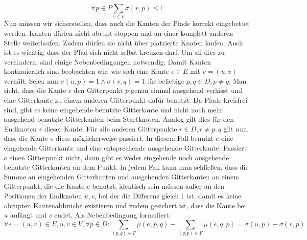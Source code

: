 \documentclass[bachelor, german]{algothesis}
\begin{document}
\begin{equation}
    \forall p \in P \sum_{v \in V} \sigma(v,p) \leq 1
    \tag{2}
\end{equation}
Nun müssen wir sicherstellen, dass auch die Kanten der Pfade korrekt eingebettet werden. Kanten dürfen nicht abrupt stoppen und an einer komplett anderen Stelle weiterlaufen. Zudem dürfen sie nicht über platzierte Knoten laufen. Auch ist es wichtig, dass der Pfad sich nicht selbst kreuzen darf. Um all dies zu verhindern, sind einige Nebenbedingungen notwendig. \newline
Damit Kanten kontinuierlich sind beobachten wir, wie sich eine Kante $e \in E$ mit $e = (u,v)$ verhält. Seien nun $\sigma(u,p) = 1 \land \sigma(v,q) = 1$ für beliebige $p,q \in D, p \neq q$. Man sieht, dass die Kante $e$ den Gitterpunkt $p$ genau einmal ausgehend verlässt und eine Gitterkante zu einem anderen Gitterpunkt dafür benutzt.  Da Pfade kreisfrei sind, gibt es keine eingehende benutzte Gitterkante und nicht noch mehr ausgehend benutzte Gitterkanten beim Startknoten. Analog gilt dies für den Endknoten $v$ dieser Kante. Für alle anderen Gitterpunkte $r \in D, r \neq p,q$ gilt nun, dass die Kante $e$ diese möglicherweise passiert. In diesem Fall benutzt $e$ eine eingehende Gitterkante und eine entsprechende ausgehende Gitterkante. Passiert $e$ einen Gitterpunkt nicht, dann gibt es weder eingehende noch ausgehende benutzte Gitterkanten an dem Punkt. In jedem Fall kann man schließen, dass die Summe an eingehenden Gitterkanten und ausgehenden Gitterkanten an einem Gitterpunkt, die die Kante $e$ benutzt, identisch sein müssen außer an den Positionen der Endknoten $u,v$, bei der die Differenz gleich 1 ist, damit es keine abrupten Kantenabbrüche existieren und zudem gesichert ist, dass die Kante bei $u$ anfängt und $v$ endet. Als Nebenbedingung formuliert: 
\begin{equation}
    \forall e=(u,v) \in E, u,v \in V, \forall p \in D: \sum_{(p,q) \in F} \mu(e,p,q) - \sum_{(q,p) \in F} \mu(e,q,p) = \sigma(u,p) - \sigma(v,p)
    \tag{3}
\end{equation}
\end{document}
